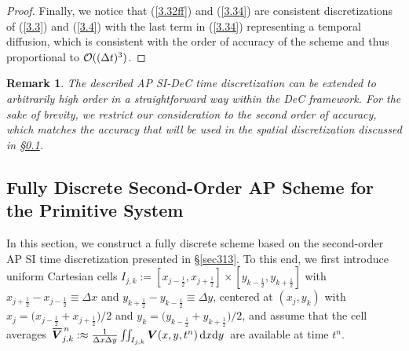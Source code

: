 \documentclass[preprint,12pt]{elsarticle}
\newtheorem{remark}{Remark}[section]
\def\bnabla{\bm{\nabla}}
\newcommand{\dt}{\Delta t}
\newcommand{\dx}{\Delta x}
\newcommand{\dy}{\Delta y}
\newcommand{\kph}{{k+\frac{1}{2}}}
\newcommand{\kmh}{{k-\frac{1}{2}}}
\newcommand{\jph}{{j+\frac{1}{2}}}
\newcommand{\jmh}{{j-\frac{1}{2}}}
\newcommand\eref[1]{(\ref{#1})}
\newcommand*\xbar[1]{%
	\hbox{%
		\vbox{%
			\hrule height 0.5pt %
			\kern0.4ex%
			\hbox{%
				\kern-0.05em%
				\ensuremath{#1}%
				\kern-0.00em%
			}%
		}%
	}%
}
\begin{document}
\begin{proof}
	Finally, we notice that \eref{3.32ff} and \eref{3.34} are consistent discretizations of \eref{3.3} and \eref{3.4} with the last term in
	\eref{3.34} representing a temporal diffusion, which is consistent with the order of accuracy of the scheme and thus proportional to
	${\cal O}((\dt)^3)$.
\end{proof}
\begin{remark}
	The described AP SI-DeC time discretization can be extended to arbitrarily high order in a straightforward way within the DeC framework. 
	For the sake of brevity, we restrict our consideration to the second order of accuracy, which matches the accuracy that will be used in the
	spatial discretization discussed in \S\ref{sec32}.
\end{remark}

\subsection{Fully Discrete Second-Order AP Scheme for the Primitive System}\label{sec32}
In this section, we construct a fully discrete scheme based on the second-order AP SI time discretization presented in \S\ref{sec313}. To
this end, we first introduce uniform Cartesian cells $I_{j,k}:=[x_\jmh,x_\jph]\times[y_\kmh,y_\kph]$ with $x_\jph-x_\jmh\equiv\dx$ and
$y_\kph-y_\kmh\equiv\dy$, centered at $(x_j,y_k)$ with $x_j=\big(x_\jmh+x_\jph\big)/2$ and $y_k=\big(y_\kmh+y_\kph\big)/2$, and assume that
the cell averages $\,\xbar{\bm V}_{j,k}^{\,n}:\approx\frac{1}{\dx\dy}\iint_{I_{j,k}}\bm V(x,y,t^n)\,{\rm d}x{\rm d}y\,$ are available at
time $t^n$.
\end{document}
